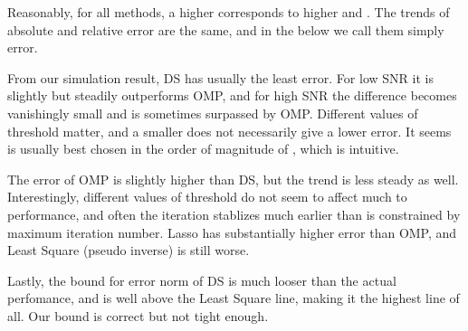 
\blank [big]

\blank [big]

\blank [big]

\stopsubsection

\startsubsection [title={Plots for \m {N_H=48}}]

\blank [big]

\blank [big]

\blank [big]



\stopsubsection

\startsubsection [title={Discussion}]

Reasonably, for all methods, a higher \m {\s} corresponds to higher  and .
The trends of absolute and relative error are the same, and in the below we call them simply error.

From our simulation result, DS has usually the least error.
For low SNR it is slightly but steadily outperforms OMP, and for high SNR the difference becomes vanishingly small and is sometimes surpassed by OMP.
Different values of threshold  matter, and a smaller  does not necessarily give a lower error.
It seems  is usually best chosen in the order of magnitude of \m {\s}, which is intuitive.

The error of OMP is slightly higher than DS, but the trend is less steady as well.
Interestingly, different values of threshold \m {\eta} do not seem to affect much to performance, and often the iteration stablizes much earlier than is constrained by maximum iteration number.
Lasso has substantially higher error than OMP, and Least Square (pseudo inverse) is still worse.

Lastly, the bound for error norm of DS is much looser than the actual perfomance, and is well above the Least Square line, making it the highest line of all.
Our bound is correct but not tight enough.

\stopsection

